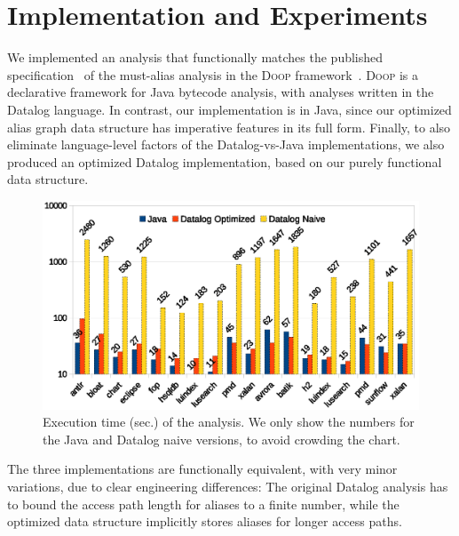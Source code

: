 \section{Implementation and Experiments}
\todo{}

We implemented an analysis that functionally matches the published
specification~\cite{soap/Balatsouras17} of the must-alias analysis in the
\textsc{Doop} framework~\cite{oopsla:2009:Bravenboer}. \textsc{Doop} is
a declarative framework for Java bytecode analysis, with analyses
written in the Datalog language. In contrast, our implementation is in
Java, since our optimized alias graph data structure has imperative
features in its full form. Finally, to also eliminate language-level
factors of the Datalog-vs-Java implementations, we also produced an
optimized Datalog implementation, based on our purely functional data
structure.

\begin{figure}[h]
  \begin{minipage}[b]{\linewidth}
    \centering
    \includegraphics[clip,width=0.77\linewidth, height=0.4275\linewidth]{assets/must-data/time.eps}
  \end{minipage}
  \caption{Execution time (sec.) of the analysis. We only show the numbers for the Java and Datalog naive versions, to avoid crowding the chart.}
    \label{fig:time}
\end{figure}

The three
implementations are functionally equivalent, with very minor
variations, due to clear engineering differences: The
original Datalog analysis has to bound the access path length for aliases to a
finite number, while the optimized data structure implicitly stores
aliases for longer access paths.

